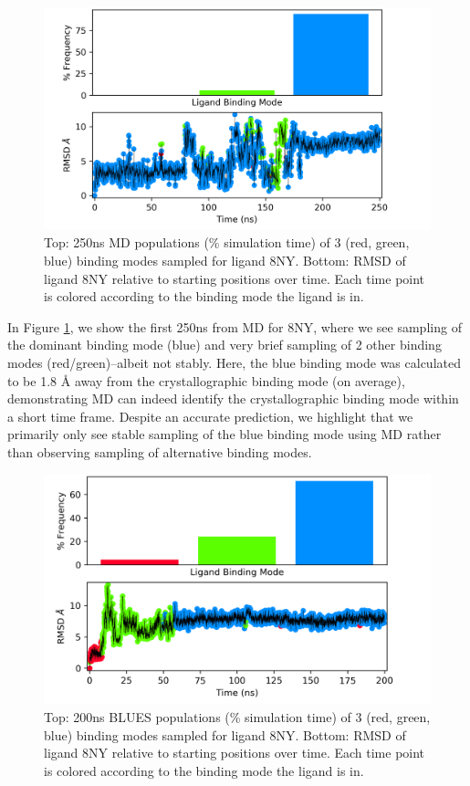 \begin{figure}
    \centering
    \includegraphics[width=\linewidth]{chapter6/Figures/8NY_c0-prod00.png}
    \caption[8NY MD Populations]{Top: 250ns MD populations (\% simulation time) of 3 (red, green, blue) binding modes sampled for ligand 8NY. Bottom: RMSD of ligand 8NY relative to starting positions over time. Each time point is colored according to the binding mode the ligand is in.}
    \label{fig:8NY_c0-md}
\end{figure}

In Figure \ref{fig:8NY_c0-md}, we show the first 250ns from MD for 8NY, where we see sampling of the dominant binding mode (blue) and very brief sampling of 2 other binding modes (red/green)--albeit not stably.
Here, the blue binding mode was calculated to be 1.8 {\AA} away from the crystallographic binding mode (on average), demonstrating MD can indeed identify the crystallographic binding mode within a short time frame.
Despite an accurate prediction, we highlight that we primarily only see stable sampling of the blue binding mode using MD rather than observing sampling of alternative binding modes.

\begin{figure}
    \centering
    \includegraphics[width=\linewidth]{chapter6/Figures/8NY_c0-14708877.png}
    \caption[8NY BLUES Populations]{Top: 200ns BLUES populations (\% simulation time) of 3 (red, green, blue) binding modes sampled for ligand 8NY. Bottom: RMSD of ligand 8NY relative to starting positions over time. Each time point is colored according to the binding mode the ligand is in.}
    \label{fig:8NY_c0-blues}
\end{figure}


